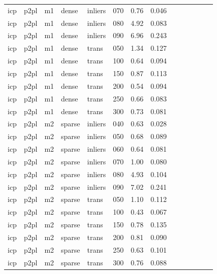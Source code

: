 \begin{table}[htbp]
\begin{tabular}{llllllrrrrrrrr}
  icp & p2pl & m1 & dense & inliers & 070 & 0.76 & 0.046 \\
  icp & p2pl & m1 & dense & inliers & 080 & 4.92 & 0.083 \\
  icp & p2pl & m1 & dense & inliers & 090 & 6.96 & 0.243 \\
  icp & p2pl & m1 & dense & trans & 050 & 1.34 & 0.127 \\
  icp & p2pl & m1 & dense & trans & 100 & 0.64 & 0.094 \\
  icp & p2pl & m1 & dense & trans & 150 & 0.87 & 0.113 \\
  icp & p2pl & m1 & dense & trans & 200 & 0.54 & 0.094 \\
  icp & p2pl & m1 & dense & trans & 250 & 0.66 & 0.083 \\
  icp & p2pl & m1 & dense & trans & 300 & 0.73 & 0.081 \\
  icp & p2pl & m2 & sparse & inliers & 040 & 0.63 & 0.028 \\
  icp & p2pl & m2 & sparse & inliers & 050 & 0.68 & 0.089 \\
  icp & p2pl & m2 & sparse & inliers & 060 & 0.64 & 0.081 \\
  icp & p2pl & m2 & sparse & inliers & 070 & 1.00 & 0.080 \\
  icp & p2pl & m2 & sparse & inliers & 080 & 4.93 & 0.104 \\
  icp & p2pl & m2 & sparse & inliers & 090 & 7.02 & 0.241 \\
  icp & p2pl & m2 & sparse & trans & 050 & 1.10 & 0.112 \\
  icp & p2pl & m2 & sparse & trans & 100 & 0.43 & 0.067 \\
  icp & p2pl & m2 & sparse & trans & 150 & 0.78 & 0.135 \\
  icp & p2pl & m2 & sparse & trans & 200 & 0.81 & 0.090 \\
  icp & p2pl & m2 & sparse & trans & 250 & 0.63 & 0.101 \\
  icp & p2pl & m2 & sparse & trans & 300 & 0.76 & 0.088 \\
\bottomrule
\end{tabular}
\end{table}
